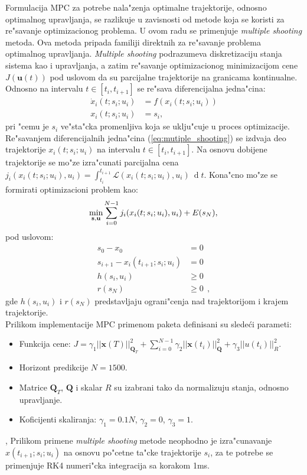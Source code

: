 \documentclass[a4paper,11pt]{article}
\theoremstyle{definition} \newtheorem{deff}{Definicija}[section]
\theoremstyle{definition} \newtheorem{prim}[deff]{Primer}
\theoremstyle{plain} \newtheorem{teor}[deff]{Teorema}
\begin{document}
	 Formulacija MPC za potrebe nala"zenja optimalne trajektorije, odnosno optimalnog upravljanja, se razlikuje u zavisnosti od metode koja se koristi za re"savanje optimizacionog problema. U ovom radu se primenjuje \emph{multiple shooting} metoda. Ova metoda pripada familiji direktnih za re"savanje problema optimalnog upravljanja. \emph{Multiple shooting} podrazumeva diskretizaciju stanja sistema kao i upravljanja, a zatim re"savanje optimizacionog minimizacijom cene $J(\mathbf{u}(t))$ pod uslovom da su parcijalne trajektorije na granicama kontinualne. Odnosno na intervalu $t\in[t_i, t_{i+1}]$ se re"sava diferencijalna jedna"cina:
	\begin{align}\label{eq:mutiple_shooting}
		\dot{x}_i(t; s_i; u_i) &= f(x_i(t; s_i; u_i)) \\
		x_i(t; s_i; u_i) &= s_i,
	\end{align}
	pri "cemu je $s_i$ ve"sta"cka promenljiva koja se uklju"cuje u proces optimizacije. Re"savanjem diferencijalnih jedna"cina (\ref{eq:mutiple_shooting}) se izdvaja deo trajektorije $x_i(t; s_i; u_i)$ na intervalu $t\in[t_i, t_{i+1}]$. Na osnovu dobijene trajektorije se mo"ze izra"cunati parcijalna cena $j_i(x_i(t; s_i; u_i), u_i) = \int_{t_i}^{t_{i+1}}\mathcal{L}(x_i(t; s_i; u_i), u_i)~\operatorname{d}t$. Kona"cno mo"ze se formirati optimizacioni problem kao:
	\begin{equation}\label{eq:multiple_minimize}
		\min_{\mathbf{s}, \mathbf{u}} \sum_{i=0}^{N-1} j_i(x_i(t; s_i; u_i), u_i) + E(s_N), \\
	\end{equation}pod uslovom:
	\begin{align}
		s_0 - x_0 &= 0\\
		s_{i+1} - x_i(t_{i+1}; s_i; u_i) &= 0\\
		h(s_i, u_i) &\geq 0\\
		r(s_N) &\geq 0 ~~,
	\end{align} gde $h(s_i, u_i)$ i $r(s_N)$ predstavljaju ograni"cenja nad trajektorijom i krajem trajektorije. \cite{multiple_shooting}\\
	
	Prilikom implementacije MPC primenom \cite{CASADI} paketa definisani su slede\'ci parameti:
	\begin{itemize}
		\item Funkcija cene: $J = \gamma_1||\mathbf{x}(T)||^2_{\mathbf{Q}_T} + \sum_{i = 0}^{N-1}\gamma_2||\mathbf{x}(t_i)||^2_{\mathbf{Q}} + \gamma_3||u(t_i)||^2_{R}$.
		\item Horizont predikcije $N = 1500$.
		\item Matrice $\mathbf{Q}_T$, $\mathbf{Q}$ i skalar $R$ su izabrani tako da normalizuju stanja, odnosno upravljanje. 
		\item Koficijenti skaliranja: $\gamma_1 = 0.1N$, $\gamma_2=0$, $\gamma_3=1$. 
		
	\end{itemize}, 
	 Prilikom primene \emph{multiple shooting} metode neophodno je izra"cunavanje $x(t_{i+1}; s_i; u_i)$ na osnovu po"cetne ta"cke trajektorije $s_i$, za te potrebe se primenjuje RK4 numeri"cka integracija sa korakom 1ms. \\
	
\end{document}
